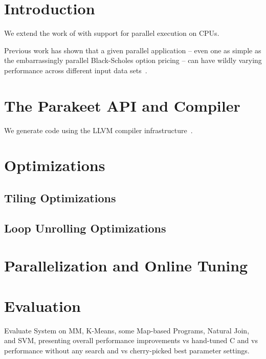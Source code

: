 \documentclass[preprint,9pt]{sigplanconf}
\begin{document}



\section{Introduction}
We extend the work of \cite{Rubi12} with support for parallel execution on CPUs.

Previous work has shown that a given parallel application -- even one as simple as the embarrassingly parallel Black-Scholes option pricing -- can have wildly varying performance across different input data sets~\cite{Rama12}.

\section{The Parakeet API and Compiler}
We generate code using the LLVM compiler infrastructure~\cite{Latt02}.

\section{Optimizations}

\subsection{Tiling Optimizations}

\subsection{Loop Unrolling Optimizations}

\section{Parallelization and Online Tuning}

\section{Evaluation}
Evaluate System on MM, K-Means, some Map-based Programs, Natural Join, and SVM, presenting overall performance improvements vs hand-tuned C and vs performance without any search and vs cherry-picked best parameter settings.
\end{document}
